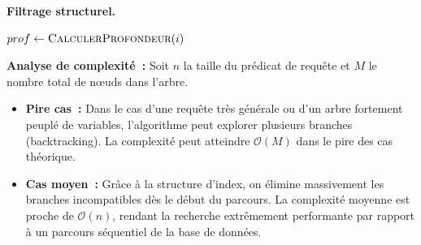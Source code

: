 \documentclass[11pt]{article}
\newenvironment{paraph}[1]{%
  \medskip
  \noindent\textbf{#1.}\quad

  \vspace{0.2cm}
}{%
  \medskip
}
\begin{document}
\begin{paraph}{Filtrage structurel}
\begin{algorithm}[H]
\begin{algorithmic}[1]
                \State{}
                \State$prof \gets \Call{CalculerProfondeur}{i}$
                        \State{}
                    \EndIf
                \EndFor
                
            \EndProcedure
        \end{algorithmic}
    \end{algorithm}

    \vspace{0.2cm}
    \textbf{Analyse de complexité~:}
    Soit $n$ la taille du prédicat de requête et $M$ le nombre total de nœuds dans l'arbre.
    \begin{itemize}
        \item \textbf{Pire cas~:} Dans le cas d'une requête très générale ou d'un arbre fortement peuplé de variables, l'algorithme peut explorer plusieurs branches (backtracking). La complexité peut atteindre $\mathcal{O}(M)$ dans le pire des cas théorique.
        \item \textbf{Cas moyen~:} Grâce à la structure d'index, on élimine massivement les branches incompatibles dès le début du parcours. La complexité moyenne est proche de $\mathcal{O}(n)$, rendant la recherche extrêmement performante par rapport à un parcours séquentiel de la base de données.
    \end{itemize}
\end{paraph}
\end{document}

